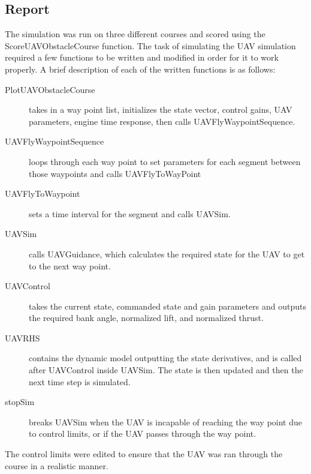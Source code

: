 \documentclass[12pt]{article}
\begin{document}
\subsection*{Report} 
The simulation was run on three different courses and scored using the ScoreUAVObstacleCourse function. 
The task of simulating the UAV simulation required a few functions to be written and modified in order for it to work properly. A brief description of each of the written functions is as follows: 
\begin{description}
	\item[PlotUAVObstacleCourse] takes in a way point list, initializes the state vector, control gains, UAV parameters, engine time response, then calls UAVFlyWaypointSequence.
	\item[UAVFlyWaypointSequence] loops through each way point to set parameters for each segment between those waypoints and calls UAVFlyToWayPoint
	\item[UAVFlyToWaypoint] sets a time interval for the segment and calls 
	UAVSim. 
	\item[UAVSim] calls UAVGuidance, which calculates the required state for the UAV to get to the next way point. 
	\item[UAVControl] takes the current state, commanded state and gain parameters and outputs the required bank angle, normalized lift, and normalized thrust.
	\item[UAVRHS] contains the dynamic model outputting the state derivatives, and is called after UAVControl inside UAVSim. The state is then updated and then the next time step is simulated. 
	\item[stopSim] breaks UAVSim when the UAV is incapable of reaching the way point due to control limits, or if the UAV passes through the way point. 
\end{description}

The control limits were edited to ensure that the UAV was ran through the course in a realistic manner. 
\end{document}
